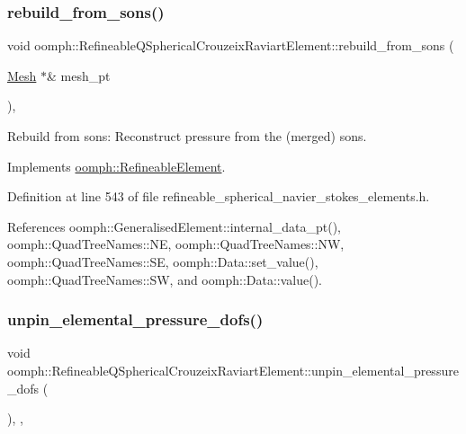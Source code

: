 \subsubsection{\texorpdfstring{rebuild\+\_\+from\+\_\+sons()}{rebuild\_from\_sons()}}
{\footnotesize\ttfamily void oomph\+::\+Refineable\+Q\+Spherical\+Crouzeix\+Raviart\+Element\+::rebuild\+\_\+from\+\_\+sons (\begin{DoxyParamCaption}\item[{\hyperlink{classoomph_1_1Mesh}{Mesh} $\ast$\&}]{mesh\+\_\+pt }\end{DoxyParamCaption})\hspace{0.3cm}{\ttfamily [inline]}, {\ttfamily [virtual]}}



Rebuild from sons\+: Reconstruct pressure from the (merged) sons. 



Implements \hyperlink{classoomph_1_1RefineableElement_a33324be27833fa4b78279d17158215fa}{oomph\+::\+Refineable\+Element}.



Definition at line 543 of file refineable\+\_\+spherical\+\_\+navier\+\_\+stokes\+\_\+elements.\+h.



References oomph\+::\+Generalised\+Element\+::internal\+\_\+data\+\_\+pt(), oomph\+::\+Quad\+Tree\+Names\+::\+NE, oomph\+::\+Quad\+Tree\+Names\+::\+NW, oomph\+::\+Quad\+Tree\+Names\+::\+SE, oomph\+::\+Data\+::set\+\_\+value(), oomph\+::\+Quad\+Tree\+Names\+::\+SW, and oomph\+::\+Data\+::value().

\mbox{\label{classoomph_1_1RefineableQSphericalCrouzeixRaviartElement_a6812b8e6bb7bbe56c75e60296512baa7}} 
\subsubsection{\texorpdfstring{unpin\+\_\+elemental\+\_\+pressure\+\_\+dofs()}{unpin\_elemental\_pressure\_dofs()}}
{\footnotesize\ttfamily void oomph\+::\+Refineable\+Q\+Spherical\+Crouzeix\+Raviart\+Element\+::unpin\+\_\+elemental\+\_\+pressure\+\_\+dofs (\begin{DoxyParamCaption}{ }\end{DoxyParamCaption})\hspace{0.3cm}{\ttfamily [inline]}, {\ttfamily [private]}, {\ttfamily [virtual]}}



